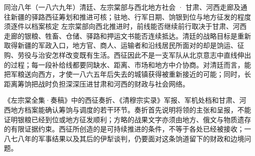 \begin{event}{}{同治八年（一八六九年）}{清廷、左宗棠部与西北地方社会 · 甘肃、河西走廊及通往新疆的驿路}{西征筹划和推进可核；驻地、行军日期、饷银到位与地方征发的程度须逐件以档案核定}
左宗棠部向西北推进时，前线能否继续前行取决于甘肃、河西走廊的银粮、牲畜、仓储、驿路和押运文书能否连续抵达。清廷的战略目标是重新取得新疆的军政入口，地方官、商人、运输者和沿线居民所面对的却是饷运、征购、劳役与治安怎样改变既有生活。西征因此不是一支军队从北京意志中直线伸出的过程；每一段补给线都要同缺水、距离、市场和地方中介协商。对清廷而言，能把军粮送向西方，才使一八六五年后失去的城镇获得被重新接近的可能；同时，长距离筹饷把战时负担深深压进甘肃和河西的财政与社会网络。

《左宗棠全集·奏稿》中的西征奏折、《清穆宗实录》军报、军机处档和甘肃、河西地方档案能确认筹饷与调度的若干环节。奏折首先说明将领的主张和呈报，不能证明银粮已经到位或地方征发顺利；方略的战果文字亦须由地方、俄文与物质遗存的有限证据约束。西征所创造的是可持续推进的条件，不等于各处已经被接收；一八七八年的军事结果以及其后的伊犁谈判，仍要面对这条饷道留下的财政和边境问题。
\end{event}